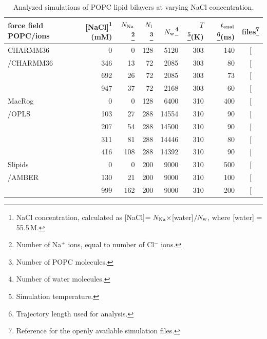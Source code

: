 \documentclass[journal=jpcbfk,manuscript=article,layout=twocolumn]{achemso}
\begin{document}
\begin{table}[]
\caption{Analyzed simulations of POPC lipid bilayers at varying NaCl concentration.}
\begin{minipage}[t]{\columnwidth}
\resizebox{\columnwidth}{!} {
\begin{tabular}{lrrrrrrc}
force field POPC/ions &
{[}NaCl{]}\footnote{NaCl concentration, calculated as
{[}NaCl{]}$=N_{{\rm Na}}\times${[}water{]}$/N_{{\rm w}}$, where {[}water{]} = 55.5\,M.} (mM)  &
$N_{{\rm Na}}$\footnote{Number of Na$^+$ ions, equal to number of Cl$^-$ ions.}   &
$N_{\rm l}$\footnote{Number of POPC molecules.}   &
$N_{\rm w}$\footnote{Number of water molecules.} &
$T$\footnote{Simulation temperature.}(K) &
$t_{{\rm anal}}$\footnote{Trajectory length used for analysis.}(ns) &
files\footnote{Reference for the openly available simulation files.}\tabularnewline
\hline 
CHARMM36\cite{klauda10}%
	&0	&0	&128	& 5120	&303	&140	& {[}\!\!\citenum{charmm36files}{]}\tabularnewline
/CHARMM36\cite{venable13}
	&346	&13	& 72	& 2085	&303	& 80	& {[}\!\!\citenum{charmmPOPC350mMNaClfiles}{]} \tabularnewline
	&692	&26	& 72	& 2085	&303	& 73	& {[}\!\!\citenum{charmmPOPC690mMNaClfiles}{]} \tabularnewline
	&947	&37	& 72	& 2168	&303	& 60	& {[}\!\!\citenum{charmmPOPC950mMNaClfiles}{]} \tabularnewline[1.0ex]

MacRog\cite{kulig15}%
	&0	&0	&128	& 6400	&310	&400	& {[}\!\!\citenum{macrogCHOLfiles}{]}\tabularnewline
/OPLS\cite{aqvist90}
	&103	&27	&288	& 14554	&310	& 90	& {[}\!\!\citenum{macrogIONfiles}{]} \tabularnewline
	&207	&54	&288	& 14500	&310	& 90	& {[}\!\!\citenum{macrogIONfiles}{]} \tabularnewline
	&311	&81	&288	& 14446	&310	& 80	& {[}\!\!\citenum{macrogIONfiles}{]} \tabularnewline
	&416	&108	&288	& 14392	&310	& 90	& {[}\!\!\citenum{macrogIONfiles}{]} \tabularnewline[1.0ex]

Slipids \cite{jambeck12b}%
	&0	&0	&200	& 9000	&310	&500	& {[}\!\!\citenum{slipidsFILESpopcchol}{]}\tabularnewline
/AMBER\cite{smith94}
	&130	& 21	&200	& 9000	&310	&100	& {[}\!\!\citenum{slipidsFILESpopc130mMnaclSD}{]} \tabularnewline
	&999	&162	&200	& 9000	&310	&200	& {[}\!\!\citenum{slipidsFILESpopc1MnaclSD}{]}\tabularnewline
\end{tabular}
}
\end{minipage}
\label{tab:salt}
\end{table}
\end{document}
